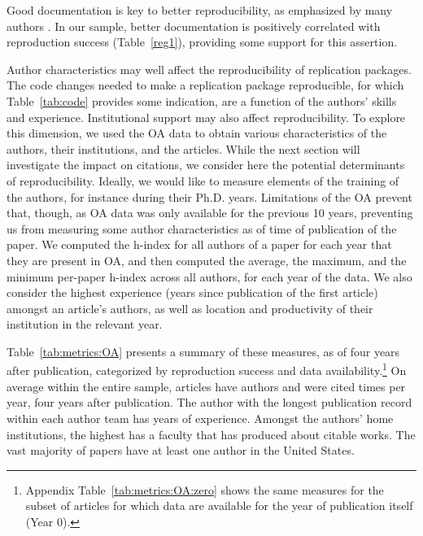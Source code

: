 \FloatBarrier
Good documentation is key to better reproducibility, as emphasized by many authors \parencite{McCullough2006, ChangLi2015,Stark2018}. In our sample,  better documentation is positively correlated with reproduction success (Table~\ref{reg1}), providing some support for this assertion.

 

\FloatBarrier




Author characteristics may well affect the reproducibility of replication packages. The code changes needed to make a replication package reproducible, for which Table~\ref{tab:code} provides some indication, are a function of the authors' skills and experience. Institutional support may also affect reproducibility. To explore this dimension, we used the OA data to obtain various characteristics of the authors, their institutions, and the articles. While the next section will investigate the impact on citations, we consider here the potential determinants of reproducibility. Ideally, we would like to measure elements of the training of the authors, for instance during their Ph.D. years. Limitations of the OA prevent that, though, as OA data was only available for the previous 10 years, preventing us from measuring some author characteristics as of time of publication of the paper. 
%
We computed the h-index \citep{Hirsch2005} for all authors of a paper for each year that they are present in OA, and then computed the average, the maximum, and the minimum per-paper h-index across all authors, for each year of the data.  We also consider the highest experience (years since publication of the first article) amongst an article's authors, as well as location and productivity of their institution in the relevant year. 

Table~\ref{tab:metrics:OA} presents a summary of these measures, as of four years after publication, categorized by reproduction success and data availability.\footnote{Appendix Table~\ref{tab:metrics:OA:zero} shows the same measures for the subset of articles for which data are available for the year of publication itself (Year 0).} On average within the entire sample, articles have   authors and were cited   times per year, four years after publication. The author with the longest publication record within each author team has  years of experience. Amongst the authors' home institutions, the highest has a faculty that has produced about  citable works. The vast majority of papers have at least one author in the United States. 

